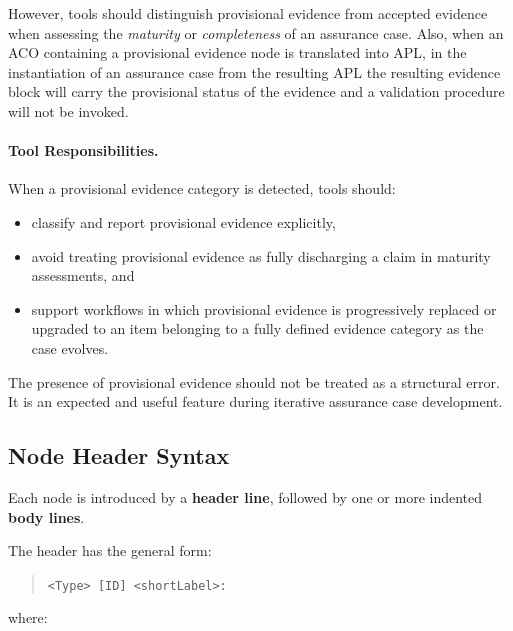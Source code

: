 \documentclass[11pt,twoside,a4paper]{article}
\begin{document}
However, tools should distinguish provisional evidence from accepted evidence when
assessing the \emph{maturity} or \emph{completeness} of an assurance case.
Also, when an ACO containing a provisional evidence node is translated into APL, in the instantiation of an assurance case from the resulting APL the resulting evidence block will carry the provisional status of the evidence and a validation procedure will not be invoked.

\paragraph{Tool Responsibilities.}
When a provisional evidence category is detected, tools should:
\begin{itemize}[leftmargin=2em]
  \item classify and report provisional evidence explicitly,
  \item avoid treating provisional evidence as fully discharging a claim in
        maturity assessments, and
  \item support workflows in which provisional evidence is progressively replaced
        or upgraded to an item belonging to a fully defined evidence category as the case evolves.
\end{itemize}

The presence of provisional evidence should not be treated as a structural error.
It is an expected and useful feature during iterative assurance case development.

\subsection{Node Header Syntax}

Each node is introduced by a \textbf{header line}, followed by one or more indented \textbf{body lines}.

The header has the general form:
\begin{quote}
\texttt{\textless Type\textgreater{} [ID] \textless shortLabel\textgreater:}
\end{quote}

where:
\end{document}
